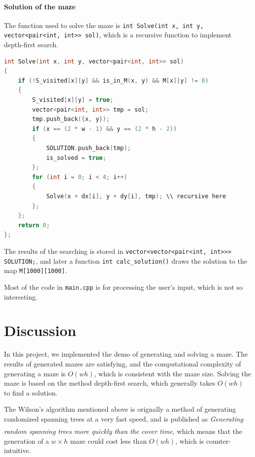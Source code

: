 \documentclass[cn,black,12pt,normal]{elegantnote}
\newcommand{\uct}[1]{\textsuperscript{\textsuperscript{\cite{#1}}}}
\begin{document}
\paragraph{Solution of the maze} The function used to solve the maze is \lstinline{int Solve(int x, int y, vector<pair<int, int>> sol)}, which is a recursive function to implement depth-first search.
\begin{lstlisting}[language = C++]
int Solve(int x, int y, vector<pair<int, int>> sol)
{
	if (!S_visited[x][y] && is_in_M(x, y) && M[x][y] != 0)
	{
		S_visited[x][y] = true;
		vector<pair<int, int>> tmp = sol;
		tmp.push_back({x, y});
		if (x == (2 * w - 1) && y == (2 * h - 2))
		{
			SOLUTION.push_back(tmp);
			is_solved = true;
		};
		for (int i = 0; i < 4; i++)
		{
			Solve(x + dx[i], y + dy[i], tmp); \\ recursive here
		};
	};
	return 0;
};
\end{lstlisting}
The results of the searching is stored in \lstinline{vector<vector<pair<int, int>>> SOLUTION;}, and later a function \lstinline{int calc_solution()} draws the solution to the map \lstinline{M[1000][1000]}.

Most of the code in \lstinline{main.cpp} is for processing the user's input, which is not so interesting.


\section{Discussion}

In this project, we implemented the demo of generating and solving a maze. The results of generated mazes are satisfying, and the computational complexity of generating a maze is $O(wh)$, which is consistent with the maze size. Solving the maze is based on the method depth-first search, which generally takes $O(wh)$ to find a solution.

The Wilson's algorithm mentioned above is orignally a method of generating randomized spanning trees at a very fast speed, and is published as \textit{Generating random spanning trees more quickly than the cover time}\uct{wilson1996generating}, which means that the generation of a $w \times h$ maze could cost less than $O(wh)$, which is counter-intuitive.


\end{document}
